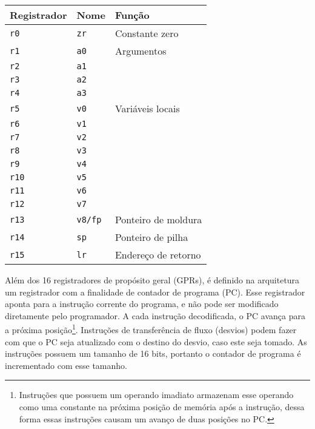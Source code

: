 \documentclass[11pt,a4paper]{report}
\begin{document}
\begin{table}[htb!]
\centering
\begin{tabular}{|p{2.5cm}|p{2.5cm}|p{6.0cm}|}
\hline
\bf{Registrador} & \bf{Nome} & \bf{Função} 		\\ \hline \hline
\texttt{r0}	& \texttt{zr}		& Constante zero	\\ \hline
\texttt{r1}	& \texttt{a0}		& Argumentos	 	\\ \hline
\texttt{r2}	& \texttt{a1}		& 	 		\\ \hline
\texttt{r3}	& \texttt{a2}		& 	 		\\ \hline
\texttt{r4}	& \texttt{a3}		& 	 		\\ \hline
\texttt{r5}	& \texttt{v0}		& Variáveis locais	\\ \hline
\texttt{r6}	& \texttt{v1}		& 		 	\\ \hline
\texttt{r7}	& \texttt{v2}		& 		 	\\ \hline
\texttt{r8}	& \texttt{v3}		& 			\\ \hline
\texttt{r9}	& \texttt{v4}		& 		 	\\ \hline
\texttt{r10}	& \texttt{v5}		& 	 		\\ \hline
\texttt{r11}	& \texttt{v6}		& 	 		\\ \hline
\texttt{r12}	& \texttt{v7}		& 	 		\\ \hline
\texttt{r13}	& \texttt{v8/fp}	& Ponteiro de moldura	\\ \hline
\texttt{r14}	& \texttt{sp}		& Ponteiro de pilha 	\\ \hline
\texttt{r15}	& \texttt{lr}		& Endereço de retorno 	\\ \hline
\end{tabular}
\end{table}

Além dos 16 registradores de propósito geral (GPRs), é definido na
arquitetura um registrador com a finalidade de contador de programa (PC).
Esse registrador aponta para a instrução corrente do programa, e não pode
ser modificado diretamente pelo programador. A cada instrução decodificada,
o PC avança para a próxima posição\footnote{Instruções que possuem um
operando imadiato armazenam esse operando como uma constante na próxima
posição de memória após a instrução, dessa forma essas instruções
causam um avanço de duas posições no PC.}. Instruções de transferência
de fluxo (desvios) podem fazer com que o PC seja atualizado com o
destino do desvio, caso este seja tomado. As instruções possuem um
tamanho de 16 bits, portanto o contador de programa é incrementado com
esse tamanho.
\end{document}
